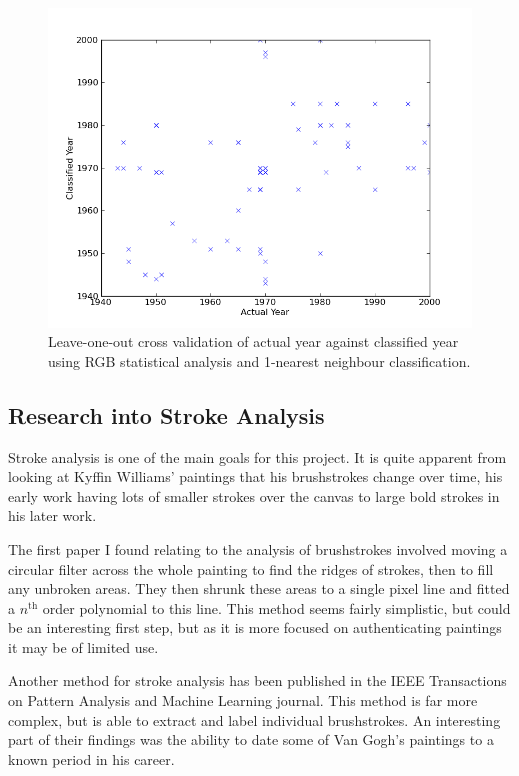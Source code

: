 \documentclass[11pt,fleqn,twoside]{article}
\begin{document}
\begin{figure}[h]
\includegraphics[scale=0.5]{img/validation-rgb-1nn.png}
\caption{Leave-one-out cross validation of actual year against classified year using RGB statistical analysis and
1-nearest neighbour classification.}
\label{fig:validation-rgb-1nn}
\end{figure}

\subsection{Research into Stroke Analysis}
Stroke analysis is one of the main goals for this project. It is quite apparent from looking at 
Kyffin Williams' paintings that his brushstrokes change over time, his early work having lots of
smaller strokes over the canvas to large bold strokes in his later work.

The first paper I found relating to the analysis of brushstrokes involved moving a circular filter
across the whole painting to find the ridges of strokes, then to fill any unbroken areas. They then
shrunk these areas to a single pixel line and fitted a $n^{\text{th}}$ order polynomial to this
line\cite{Berezhnoy2005Authentic}. This method seems fairly simplistic, but could be an interesting
first step, but as it is more focused on authenticating paintings it may be of limited use.

Another method for stroke analysis has been published in the IEEE Transactions on Pattern Analysis
and Machine Learning journal. This method is far more complex, but is able to extract and label
individual brushstrokes. An interesting part of their findings was the ability to date some of Van
Gogh's paintings to a known period in his career\cite{Li2012Rhythmic}.
\end{document}
